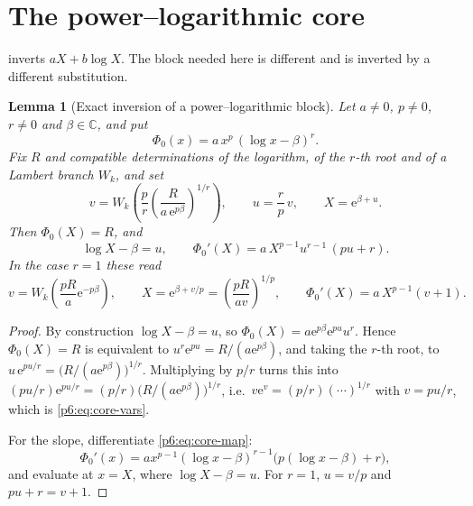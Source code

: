 \documentclass[11pt,a4paper,oneside]{book}
\theoremstyle{plain}
\newtheorem{lemma}[theorem]{Lemma}
\theoremstyle{definition}
\theoremstyle{remark}
\newcommand{\Cplx}{\mathbb{C}}
\newcommand{\e}{\mathrm{e}}
\newcommand{\Wlam}{W}
\begin{document}
\section{The power--logarithmic core}
\label{p6:sec:core}

 inverts $aX+b\log X$.  The block needed here is
different and is inverted by a different substitution.

\begin{lemma}[Exact inversion of a power--logarithmic block]
\label{p6:lem:core}
Let $a\ne0$, $p\ne0$, $r\ne0$ and $\beta\in\Cplx$, and put
\begin{equation}\label{p6:eq:core-map}
 \Phi_{0}(x)=a\,x^{p}\,(\log x-\beta)^{r} .
\end{equation}
Fix $R$ and compatible determinations of the logarithm, of the $r$-th root and
of a Lambert branch $\Wlam_k$, and set
\begin{equation}\label{p6:eq:core-vars}
 v=\Wlam_k\!\left(\frac pr\left(\frac{R}{a\,\e^{p\beta}}\right)^{1/r}\right),
 \qquad
 u=\frac rp\,v,
 \qquad
 X=\e^{\beta+u} .
\end{equation}
Then $\Phi_{0}(X)=R$, and
\begin{equation}\label{p6:eq:core-slope}
 \log X-\beta=u,
 \qquad
 \Phi_{0}'(X)=a\,X^{p-1}u^{r-1}\,(pu+r).
\end{equation}
In the case $r=1$ these read
\begin{equation}\label{p6:eq:core-r1}
 v=\Wlam_k\!\left(\frac{pR}{a}\e^{-p\beta}\right),
 \qquad
 X=\e^{\beta+v/p}=\left(\frac{pR}{av}\right)^{1/p},
 \qquad
 \Phi_{0}'(X)=a\,X^{p-1}(v+1).
\end{equation}
\end{lemma}

\begin{proof}
By construction $\log X-\beta=u$, so
$\Phi_0(X)=a\e^{p\beta}\e^{pu}u^{r}$.  Hence $\Phi_0(X)=R$ is equivalent to
$u^{r}\e^{pu}=R/(a\e^{p\beta})$, and taking the $r$-th root, to
$u\,\e^{pu/r}=\bigl(R/(a\e^{p\beta})\bigr)^{1/r}$.  Multiplying by $p/r$ turns
this into $(pu/r)\e^{pu/r}=(p/r)\bigl(R/(a\e^{p\beta})\bigr)^{1/r}$, i.e.\
$v\e^{v}=(p/r)(\cdots)^{1/r}$ with $v=pu/r$, which is
\eqref{p6:eq:core-vars}.

For the slope, differentiate \eqref{p6:eq:core-map}:
\[
 \Phi_0'(x)=a x^{p-1}(\log x-\beta)^{r-1}
 \bigl(p(\log x-\beta)+r\bigr),
\]
and evaluate at $x=X$, where $\log X-\beta=u$.  For $r=1$, $u=v/p$ and
$pu+r=v+1$.
\end{proof}
\end{document}
